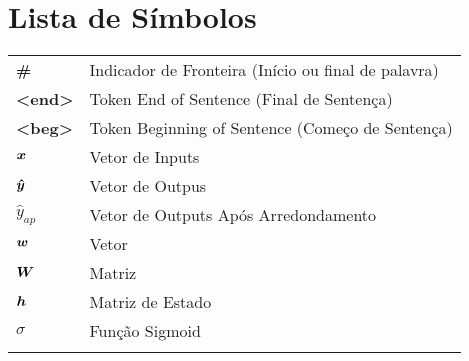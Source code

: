\chapter{Lista de Símbolos}
\begin{tabular}{ll}
\vspace{2mm}
\textbf{\#}   &Indicador de Fronteira (Início ou final de palavra)\\ \vspace{2mm}
\textbf{<end>}   &Token End of Sentence (Final de Sentença)\\ \vspace{2mm}
\textbf{<beg>}   &Token Beginning of Sentence (Começo de Sentença)\\ \vspace{2mm}
$\bm{x}$    &Vetor de Inputs\\ \vspace{2mm}
$\bm{\hat{y}}$    &Vetor de Outpus\\ \vspace{2mm}
$\hat{y}_{ap}$  &Vetor de Outputs Após Arredondamento \\ \vspace{2mm}
$\bm{w}$    &Vetor\\ \vspace{2mm}
$\bm{W}$    &Matriz\\ \vspace{2mm}
$\bm{h}$    &Matriz de Estado\\ \vspace{2mm}
$\sigma$ & Função Sigmoid \\ \vspace{2mm}
\end{tabular}

